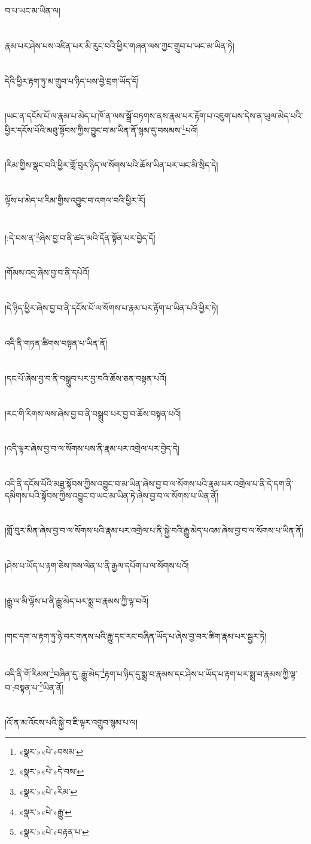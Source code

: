 བ་པ་ཡང་མ་ཡིན་ལ།\chapter{ }རྣམ་པར་ཤེས་པས་འཛིན་པར་མི་རུང་བའི་ཕྱིར་གཞན་ལས་ཀྱང་གྲུབ་པ་ཡང་མ་ཡིན་ཏེ།\chapter{ }དེའི་ཕྱིར་རྟག་ཏུ་མ་གྲུབ་པ་ཉིད་པས་བྱེ་བྲག་ཡོད་དོ།\chapter{ }།ཡང་ན་དངོས་པོ་ལ་རྣམ་པ་མེད་པ་ཁོ་ན་ལས་སྒྲོ་བཏགས་ནས་རྣམ་པར་རྟོག་པ་འཇུག་པས་དེས་ན་ཡུལ་མེད་པའི་ཕྱིར་དངོས་པོའི་མཐུ་སྟོབས་ཀྱིས་བྱུང་བ་མ་ཡིན་ནོ་སྙམ་དུ་བསམས་\footnote{«སྣར་»«པེ་»བསམ་}པའོ།\chapter{ }།རིམ་གྱིས་སྣང་བའི་ཕྱིར་གློ་བུར་ཉིད་ལ་སོགས་པའི་ཆོས་ཡིན་པར་ཡང་མི་སྲིད་དེ།\chapter{ }ལྟོས་པ་མེད་པ་རིམ་གྱིས་འབྱུང་བ་འགལ་བའི་ཕྱིར་རོ།\chapter{ }།:དེ་བས་ན་\footnote{«སྣར་»«པེ་»དེ་བས་}ཞེས་བྱ་བ་ནི་ཚད་མའི་དོན་སྟོན་པར་བྱེད་དོ།\chapter{ }།གོམས་འདྲ་ཞེས་བྱ་བ་ནི་དཔེའོ།\chapter{ }།དེ་ཉིད་ཕྱིར་ཞེས་བྱ་བ་ནི་དངོས་པོ་ལ་སོགས་པ་རྣམ་པར་རྟོག་པ་ཡིན་པའི་ཕྱིར་ཏེ།\chapter{ }འདི་ནི་གཏན་ཚིགས་བསྟན་པ་ཡིན་ནོ།\chapter{ }།དང་པོ་ཞེས་བྱ་བ་ནི་བསྒྲུབ་པར་བྱ་བའི་ཆོས་ཅན་བསྟན་པའོ།\chapter{ }།རང་གི་རིགས་ལས་ཞེས་བྱ་བ་ནི་བསྒྲུབ་པར་བྱ་བ་ཆོས་བསྟན་པའོ།\chapter{ }།འདི་ལྟར་ཞེས་བྱ་བ་ལ་སོགས་པས་ནི་རྣམ་པར་འགྲེལ་པར་བྱེད་དེ།\chapter{ }འདི་ནི་དངོས་པོའི་མཐུ་སྟོབས་ཀྱིས་འབྱུང་བ་མ་ཡིན་ཞེས་བྱ་བ་ལ་སོགས་པའི་རྣམ་པར་འགྲེལ་པ་ནི་དེ་དག་ནི་དམིགས་པའི་སྟོབས་ཀྱིས་འབྱུང་བ་ཡང་མ་ཡིན་ཏེ་ཞེས་བྱ་བ་ལ་སོགས་པ་ཡིན་ནོ།\chapter{ }།གློ་བུར་མིན་ཞེས་བྱ་བ་ལ་སོགས་པའི་རྣམ་པར་འགྲེལ་པ་ནི་སྐྱེ་བའི་རྒྱུ་མེད་པའམ་ཞེས་བྱ་བ་ལ་སོགས་པ་ཡིན་ནོ།\chapter{ }།ཤེས་པ་ཡོད་པ་རྟག་ཅེས་ཁས་ལེན་པ་ནི་རྒྱལ་དཔོག་པ་ལ་སོགས་པའོ།\chapter{ }།རྒྱུ་ལ་མི་ལྟོས་པ་ནི་རྒྱུ་མེད་པར་སྨྲ་བ་རྣམས་ཀྱི་ལྟ་བའོ།\chapter{ }།གང་དག་ལ་རྟག་ཏུ་ཉེ་བར་གནས་པའི་རྒྱུ་དང་རང་བཞིན་ཡོད་པ་ཞེས་བྱ་བར་ཚིག་རྣམ་པར་སྦྱར་ཏེ།\chapter{ }འདི་ནི་གོ་རིམས་\footnote{«སྣར་»«པེ་»རིམ་}བཞིན་དུ་:རྒྱུ་མེད་\footnote{«སྣར་»«པེ་»རྒྱུ་}རྟག་པ་ཉིད་དུ་སྨྲ་བ་རྣམས་དང་ཤེས་པ་ཡོད་པ་རྟག་པར་སྨྲ་བ་རྣམས་ཀྱི་ལྟ་བ་:བསྟན་པ་\footnote{«སྣར་»«པེ་»བརྟན་པ་}ཡིན་ནོ།\chapter{ }།འོ་ན་མ་འོངས་པའི་སྐྱེ་བ་ཇི་ལྟར་འགྲུབ་སྙམ་པ་ལ།\chapte